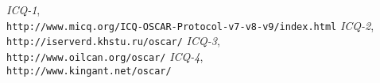 \begin{thebibliography}{9999}
 {\sl ICQ-1},\\
{\tt http://www.micq.org/ICQ-OSCAR-Protocol-v7-v8-v9/index.html}
 {\sl ICQ-2},\\
{\tt http://iserverd.khstu.ru/oscar/}
 {\sl ICQ-3},\\
{\tt http://www.oilcan.org/oscar/}
 {\sl ICQ-4},\\
{\tt http://www.kingant.net/oscar/}
\end{thebibliography}